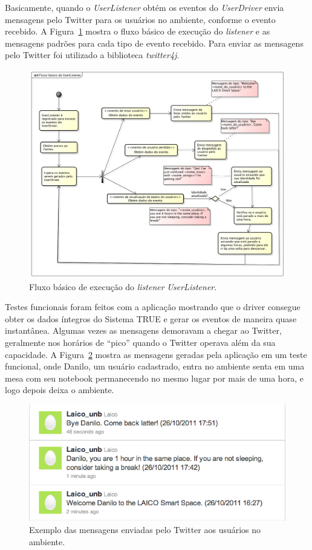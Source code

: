 	Basicamente, quando o \textit{UserListener} obtém os eventos do \textit{UserDriver} envia mensagens pelo Twitter para os usuários no ambiente, conforme o evento recebido. A Figura~\ref{fig:diagrama-tweet} mostra o fluxo básico de execução do \textit{listener} e as mensagens padrões para cada tipo de evento recebido. Para enviar as mensagens pelo Twitter foi utilizado a biblioteca \textit{twitter4j}. 

	\begin{figure}[hbt]
			\begin{center}
				\includegraphics[scale=0.45]{figuras/5.Testes/diagrama-user-tweet.png}
			\end{center}
			\caption{Fluxo básico de execução do \textit{listener} \textit{UserListener}.}
			\label{fig:diagrama-tweet}
		\end{figure}

	Testes funcionais foram feitos com a aplicação mostrando que o driver consegue obter os dados íntegros do Sistema TRUE e gerar os eventos de maneira quase instantânea. Algumas vezes as mensagens demoravam a chegar ao Twitter, geralmente nos horários de ``pico'' quando o Twitter operava além da sua capacidade. A Figura~\ref{fig:tweets} mostra as mensagens geradas pela aplicação em um teste funcional, onde Danilo, um usuário cadastrado, entra no ambiente senta em uma mesa com seu notebook permanecendo no mesmo lugar por mais de uma hora, e logo depois deixa o ambiente.

	\begin{figure}[hbt]
			\begin{center}
				\includegraphics[scale=0.6]{figuras/5.Testes/tweets.png}
			\end{center}
			\caption{Exemplo das mensagens enviadas pelo Twitter aos usuários no ambiente.}
			\label{fig:tweets}
		\end{figure}	